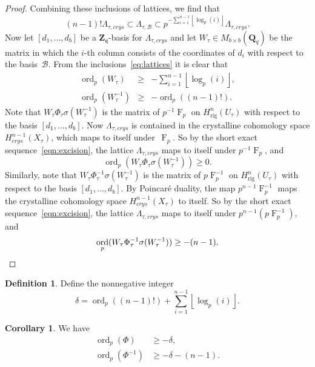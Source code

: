 \documentclass[a4paper,11pt]{article}
\numberwithin{equation}{section}
\providecommand{\floor}[1]{\left\lfloor#1\right\rfloor}   %
\newcommand{\ZZ}{\mathbf{Z}} %
\newcommand{\QQ}{\mathbf{Q}} %
\DeclareMathOperator{\ord}{ord}          %
\DeclareMathOperator{\Frob}{F}           %
\providecommand{\Hrig}{H_{\text{rig}}}  %
\providecommand{\cB}{\mathcal{B}} %
\theoremstyle{definition}
\newtheorem{cor}[thm]{Corollary}
\newtheorem{defn}[thm]{Definition}
\begin{document}
\begin{proof}
Combining these inclusions of lattices, we find that
\begin{equation} \label{eq:lattices}
(n-1)! \Lambda_{\tau,crys} \subset \Lambda_{\tau,\cB} \subset p^{-\sum_{i=1}^{n-1} \floor{\log_p(i)}} \Lambda_{\tau,crys}.
\end{equation}
Now let $[d_1, \dotsc, d_b]$ be a $\ZZ_{\mathfrak{q}}$-basis for 
$\Lambda_{\tau,crys}$ and let $W_{\tau} \in M_{b \times b}(\QQ_q)$ be 
the matrix in which the $i$-th column 
consists of the coordinates of $d_i$ with respect to the basis~$\cB$. From the 
inclusions~\eqref{eq:lattices} it is clear that 
\begin{eqnarray*}
\ord_p(W_{\tau}) &\geq& -\sum_{i=1}^{n-1} \floor{\log_p(i)}, \\
\ord_p(W_{\tau}^{-1}) &\geq& -\ord_p((n-1)!).
\end{eqnarray*}
Note that $W_{\tau} \Phi_{\tau} \sigma(W_{\tau}^{-1})$ is the matrix of 
$p^{-1}\Frob_{p}$ on $\Hrig^n(U_{\tau})$ with respect to the basis 
$[d_1,\dotsc,d_b]$. Now $\Lambda_{\tau,crys}$ is contained in the crystalline 
cohomology space $H^{n-1}_{crys}(X_{\tau})$, which maps to itself 
under~$\Frob_p$. So by the short exact sequence~\eqref{eqn:excision}, the 
lattice $\Lambda_{\tau,crys}$ maps to itself under $p^{-1}\Frob_{p}$, and
\[
\ord_p(W_{\tau} \Phi_{\tau} \sigma(W_{\tau}^{-1})) \geq 0.
\]
Similarly, note that $W_{\tau} \Phi_{\tau}^{-1} \sigma(W_{\tau}^{-1})$ is 
the matrix of $p\Frob_p^{-1}$ on $\Hrig^n(U_{\tau})$ with respect to the 
basis $[d_1,\dotsc,d_b]$. By Poincar\'e duality, the map $p^{n-1}\Frob_p^{-1}$ 
maps the crystalline cohomology space $H^{n-1}_{crys}(X_{\tau})$ to itself. 
So by the short exact sequence~\eqref{eqn:excision}, the lattice 
$\Lambda_{\tau,crys}$ maps to itself under $p^{n-1} (p\Frob_p^{-1})$, and 
\begin{equation*}
\ord_p(W_{\tau} \Phi_{\tau}^{-1} \sigma(W_{\tau}^{-1})) \geq -(n-1). \qedhere
\end{equation*}
\end{proof}

\begin{defn} \label{defn:delta}
Define the nonnegative integer
\[
\delta = \ord_p((n-1)!)+\sum_{i=1}^{n-1} \floor{\log_p(i)}.
\]
\end{defn}

\begin{cor} \label{cor:delta} We have 
\begin{align*}
\ord_p(\Phi) &\geq -\delta, \\
\ord_p(\Phi^{-1}) &\geq -\delta-(n-1).
\end{align*}
\end{cor}
\end{document}
